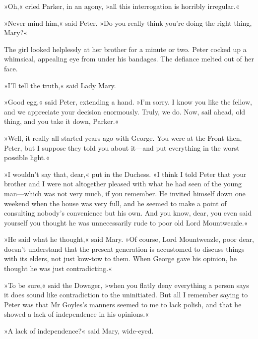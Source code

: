 »Oh,« cried Parker, in an agony, »all this interrogation is horribly irregular.«

»Never mind him,« said Peter. »Do you really think you're doing the right thing, Mary?«

The girl looked helplessly at her brother for a minute or two. Peter cocked up a whimsical, appealing eye from under his bandages. The defiance melted out of her face.

»I'll tell the truth,« said Lady Mary.

»Good egg,« said Peter, extending a hand. »I'm sorry. I know you like the fellow, and we appreciate your decision enormously. Truly, we do.  Now, sail ahead, old thing, and you take it down, Parker.«

»Well, it really all started years ago with George. You were at the Front then, Peter, but I suppose they told you about it\allowbreak---\allowbreak and put everything in the worst possible light.«

»I wouldn't say that, dear,« put in the Duchess. »I think I told Peter that your brother and I were not altogether pleased with what he had seen of the young man\allowbreak---\allowbreak which was not very much, if you remember. He invited himself down one weekend when the house was very full, and he seemed to make a point of consulting nobody's convenience but his own. And you know, dear, you even said yourself you thought he was unnecessarily rude to poor old Lord Mountweazle.«

»He said what he thought,« said Mary. »Of course, Lord Mountweazle, poor dear, doesn't understand that the present generation is accustomed to discuss things with its elders, not just kow-tow to them. When George gave his opinion, he thought he was just contradicting.«

»To be sure,« said the Dowager, »when you flatly deny everything a person says it does sound like contradiction to the uninitiated. But all I remember saying to Peter was that Mr Goyles's manners seemed to me to lack polish, and that he showed a lack of independence in his opinions.«

»A lack of independence?« said Mary, wide-eyed.

